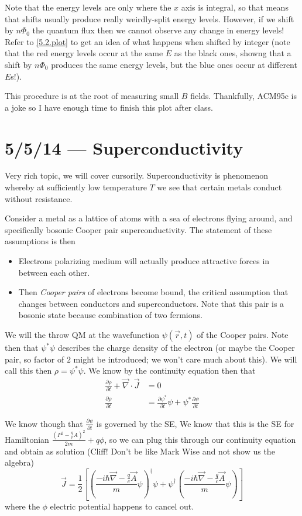 \documentclass[10pt]{report}
\newcommand{\pd}[2]{\frac{\partial #1}{\partial#2}}
\begin{document}
Note that the energy levels are only where the $x$ axis is integral, so that means that shifts usually produce really weirdly-split energy levels. However, if we shift by $n\Phi_0$ the quantum flux then we cannot observe any change in energy levels! Refer to \ref{5.2.plot} to get an idea of what happens when shifted by integer (note that the red energy levels occur at the same  $E$ as the black ones, showng that a shift by $n\Phi_0$ produces the same energy levels, but the blue ones occur at different $E$s!).

This procedure is at the root of measuring small $B$ fields. Thankfully, ACM95c is a joke so I have enough time to finish this plot after class.
\chapter{5/5/14 --- Superconductivity}

Very rich topic, we will cover cursorily. Superconductivity is phenomenon whereby at sufficiently low temperature $T$ we see that certain metals conduct without resistance. 

Consider a metal as a lattice of atoms with a sea of electrons flying around, and specifically bosonic Cooper pair superconductivity. The statement of these assumptions is then
\begin{itemize}
    \item Electrons polarizing medium will actually produce attractive forces in between each other.
    \item Then \emph{Cooper pairs} of electrons become bound, the critical assumption that changes between conductors and superconductors. Note that this pair is a bosonic state because combination of two fermions.
\end{itemize}

We will the throw QM at the wavefunction $\psi(\vec{r},t)$ of the Cooper pairs. Note then that $\psi^*\psi$ describes the charge density of the electron (or maybe the Cooper pair, so factor of $2$ might be introduced; we won't care much about this). We will call this then $\rho = \psi^*\psi$. We know by the continuity equation then that 
\begin{align}
    \pd{\rho}{t} + \vec{\nabla} \cdot \vec{J} &= 0\\
    \pd{\rho}{t} &= \pd{\psi^*}{t}\psi + \psi^* \pd{\psi}{t}
\end{align}

We know though that $\pd{\psi}{t}$ is governed by the SE, We know that this is the SE for Hamiltonian $\frac{\left(P^2 - \frac{q}{c}A\right)^2}{2m} + q\phi$, so we can plug this through our continuity equation and obtain as solution (Cliff! Don't be like Mark Wise and not show us the algebra)
\begin{equation}
    \vec{J} = \frac{1}{2}\left[ \left(\frac{-i\hbar \vec{\nabla} - \frac{q}{c}\vec{A}}{m}\psi\right)^\dagger\psi + \psi^\dagger\left( \frac{-i\hbar \vec{\nabla} - \frac{q}{c}\vec{A}}{m}\psi \right) \right]\label{5.5.J}
\end{equation}
where the $\phi$ electric potential happens to cancel out. 
\end{document}
